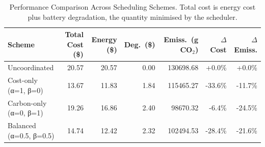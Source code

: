 \begin{table}[H]
\centering
\caption{Performance Comparison Across Scheduling Schemes. Total cost is energy cost plus battery degradation, the quantity minimised by the scheduler.}
\label{tab:performance}
\begin{tabular}{lrrrrrr}
\toprule
Scheme & Total Cost (\$) & Energy (\$) & Deg.\ (\$) & Emiss.\ (g CO$_2$) & $\Delta$Cost & $\Delta$Emiss. \\
\midrule
Uncoordinated & 20.57 & 20.57 & 0.00 & 130698.68 & +0.0\% & +0.0\% \\
Cost-only (α=1, β=0) & 13.67 & 11.83 & 1.84 & 115465.27 & -33.6\% & -11.7\% \\
Carbon-only (α=0, β=1) & 19.26 & 16.86 & 2.40 & 98670.32 & -6.4\% & -24.5\% \\
Balanced (α=0.5, β=0.5) & 14.74 & 12.42 & 2.32 & 102494.53 & -28.4\% & -21.6\% \\
\bottomrule
\end{tabular}
\end{table}